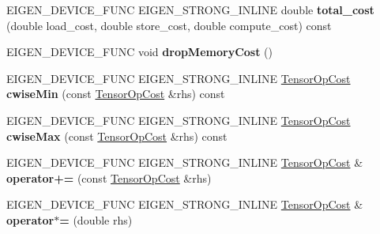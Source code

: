 \begin{DoxyCompactItemize}
E\+I\+G\+E\+N\+\_\+\+D\+E\+V\+I\+C\+E\+\_\+\+F\+U\+NC E\+I\+G\+E\+N\+\_\+\+S\+T\+R\+O\+N\+G\+\_\+\+I\+N\+L\+I\+NE double {\bfseries total\+\_\+cost} (double load\+\_\+cost, double store\+\_\+cost, double compute\+\_\+cost) const
\item 
\mbox{\label{class_eigen_1_1_tensor_op_cost_ae309b668454a04ebbaaaf2dbcc623e08}} 
E\+I\+G\+E\+N\+\_\+\+D\+E\+V\+I\+C\+E\+\_\+\+F\+U\+NC void {\bfseries drop\+Memory\+Cost} ()
\item 
\mbox{\label{class_eigen_1_1_tensor_op_cost_a1ab887f487b37baa8808be9973f91297}} 
E\+I\+G\+E\+N\+\_\+\+D\+E\+V\+I\+C\+E\+\_\+\+F\+U\+NC E\+I\+G\+E\+N\+\_\+\+S\+T\+R\+O\+N\+G\+\_\+\+I\+N\+L\+I\+NE \hyperlink{class_eigen_1_1_tensor_op_cost}{Tensor\+Op\+Cost} {\bfseries cwise\+Min} (const \hyperlink{class_eigen_1_1_tensor_op_cost}{Tensor\+Op\+Cost} \&rhs) const
\item 
\mbox{\label{class_eigen_1_1_tensor_op_cost_a41a42f41c2b31092bfaae8b34e8120c5}} 
E\+I\+G\+E\+N\+\_\+\+D\+E\+V\+I\+C\+E\+\_\+\+F\+U\+NC E\+I\+G\+E\+N\+\_\+\+S\+T\+R\+O\+N\+G\+\_\+\+I\+N\+L\+I\+NE \hyperlink{class_eigen_1_1_tensor_op_cost}{Tensor\+Op\+Cost} {\bfseries cwise\+Max} (const \hyperlink{class_eigen_1_1_tensor_op_cost}{Tensor\+Op\+Cost} \&rhs) const
\item 
\mbox{\label{class_eigen_1_1_tensor_op_cost_a30660514bb69f91a0f993e1869797a03}} 
E\+I\+G\+E\+N\+\_\+\+D\+E\+V\+I\+C\+E\+\_\+\+F\+U\+NC E\+I\+G\+E\+N\+\_\+\+S\+T\+R\+O\+N\+G\+\_\+\+I\+N\+L\+I\+NE \hyperlink{class_eigen_1_1_tensor_op_cost}{Tensor\+Op\+Cost} \& {\bfseries operator+=} (const \hyperlink{class_eigen_1_1_tensor_op_cost}{Tensor\+Op\+Cost} \&rhs)
\item 
\mbox{\label{class_eigen_1_1_tensor_op_cost_a40b904633b50a3b8b8c788f6f53644c7}} 
E\+I\+G\+E\+N\+\_\+\+D\+E\+V\+I\+C\+E\+\_\+\+F\+U\+NC E\+I\+G\+E\+N\+\_\+\+S\+T\+R\+O\+N\+G\+\_\+\+I\+N\+L\+I\+NE \hyperlink{class_eigen_1_1_tensor_op_cost}{Tensor\+Op\+Cost} \& {\bfseries operator$\ast$=} (double rhs)
\item 
\mbox{\label{class_eigen_1_1_tensor_op_cost_a28957e6eb06dc8d5b36aa54d6b5d908f}} 

\end{DoxyCompactItemize}
